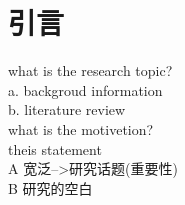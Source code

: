 \documentclass{cjc}
\begin{document}
\maketitle{}


\section{引言}
  what is the research topic?\\
  a. backgroud information \\
  b. literature review\\
  what is the motivetion?\\
  theis statement\\
  A 宽泛-->研究话题(重要性)\\
  B 研究的空白\\










\end{document}
